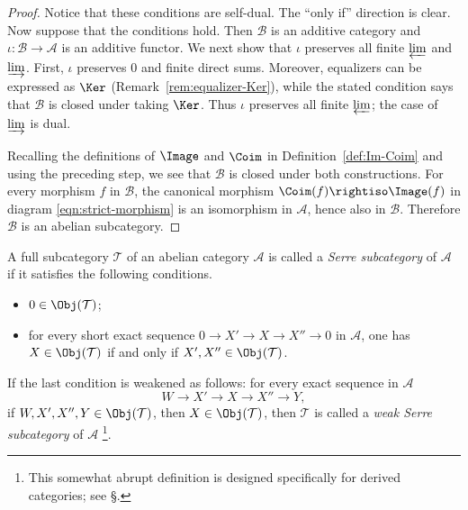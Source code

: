 \begin{proof}
Notice that these conditions are self-dual. The ``only if'' direction is
clear. Now suppose that the conditions hold. Then $\mathcal{B}$ is an additive
category and $\iota:\mathcal{B}\to\mathcal{A}$ is an additive functor. We next
show that $\iota$ preserves all finite $\varprojlim$ and $\varinjlim$. First,
$\iota$ preserves $0$ and finite direct sums. Moreover, equalizers can be
expressed as $\Ker$ (Remark~\ref{rem:equalizer-Ker}), while the stated
condition says that $\mathcal{B}$ is closed under taking $\Ker$. Thus $\iota$
preserves all finite $\varprojlim$; the case of $\varinjlim$ is dual.

Recalling the definitions of $\Image$ and $\Coim$ in
Definition~\ref{def:Im-Coim} and using the preceding step, we see that
$\mathcal{B}$ is closed under both constructions. For every morphism $f$ in
$\mathcal{B}$, the canonical morphism
$\Coim(f)\rightiso\Image(f)$ in diagram \eqref{eqn:strict-morphism} is an
isomorphism in $\mathcal{A}$, hence also in $\mathcal{B}$. Therefore
$\mathcal{B}$ is an abelian subcategory.
\end{proof}

\begin{definition}[J.-P.\ Serre]\label{def:Serre-subcat}
A full subcategory $\mathcal{T}$ of an abelian category $\mathcal{A}$ is
called a \emph{Serre subcategory} of $\mathcal{A}$ if it satisfies the
following conditions.
\begin{itemize}
	\item $0\in\Obj(\mathcal{T})$;
	\item for every short exact sequence
	$0\to X'\to X\to X''\to0$ in $\mathcal{A}$, one has
	$X\in\Obj(\mathcal{T})$ if and only if
	$X',X''\in\Obj(\mathcal{T})$.
\end{itemize}
If the last condition is weakened as follows: for every exact sequence in
$\mathcal{A}$
\[W\to X'\to X\to X''\to Y,\]
if $W,X',X'',Y\in\Obj(\mathcal{T})$, then $X\in\Obj(\mathcal{T})$, then
$\mathcal{T}$ is called a \emph{weak Serre subcategory} of $\mathcal{A}$
\footnote{This somewhat abrupt definition is designed specifically for
derived categories; see \S{}.}.
\end{definition}

